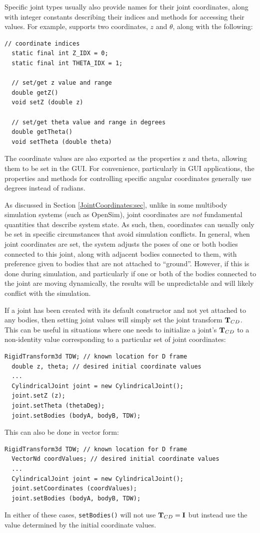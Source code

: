 Specific joint types usually also provide names for their joint
coordinates, along with integer constants describing their indices
and methods for accessing their values. For example,
supports two coordinates, $z$ and $\theta$, along with
the following:
%
\begin{lstlisting}[]
  // coordinate indices
  static final int Z_IDX = 0;
  static final int THETA_IDX = 1;

  // set/get z value and range
  double getZ()
  void setZ (double z)

  // set/get theta value and range in degrees
  double getTheta()
  void setTheta (double theta)
\end{lstlisting}
%
The coordinate values are also exported as the properties {\sf z} and
{\sf theta}, allowing them to be set in the GUI. For convenience,
particularly in GUI applications, the properties and methods for
controlling specific angular coordinates generally use degrees instead
of radians.

As discussed in Section \ref{JointCoordinates:sec}, unlike in some
multibody simulation systems (such as OpenSim), joint coordinates are
{\it not} fundamental quantities that describe system state. As such,
then, coordinates can usually only be set in specific circumstances
that avoid simulation conflicts. In general, when joint coordinates
are set, the system adjusts the poses of one or both bodies connected
to this joint, along with adjacent bodies connected to them, with
preference given to bodies that are not attached to ``ground''.
However, if this is done during simulation, and particularly if one or
both of the bodies connected to the joint are moving dynamically, the
results will be unpredictable and will likely conflict with the
simulation.

If a joint has been created with its default constructor and not yet
attached to any bodies, then setting joint values will simply set the
joint transform ${\bf T}_{CD}$. This can be useful in situations where one
needs to initialize a joint's ${\bf T}_{CD}$ to a non-identity value
corresponding to a particular set of joint coordinates:
%
\begin{lstlisting}[]
  RigidTransform3d TDW; // known location for D frame
  double z, theta; // desired initial coordinate values
  ...
  CylindricalJoint joint = new CylindricalJoint();
  joint.setZ (z);
  joint.setTheta (thetaDeg);
  joint.setBodies (bodyA, bodyB, TDW);
\end{lstlisting}
%
This can also be done in vector form:
%
\begin{lstlisting}[]
  RigidTransform3d TDW; // known location for D frame
  VectorNd coordValues; // desired initial coordinate values
  ...
  CylindricalJoint joint = new CylindricalJoint();
  joint.setCoordinates (coordValues);
  joint.setBodies (bodyA, bodyB, TDW);
\end{lstlisting}
%
In either of these cases, {\tt setBodies()} will not use ${\bf T}_{CD}
= {\bf I}$ but instead use the value determined by the initial coordinate
values.

